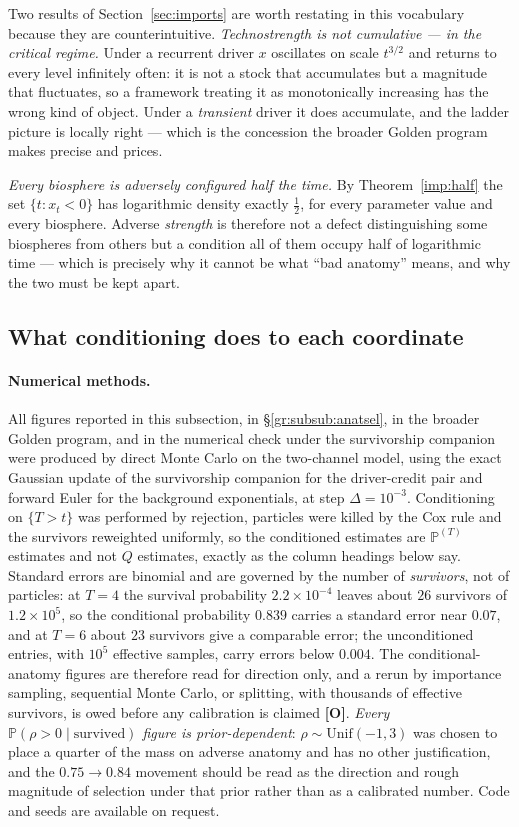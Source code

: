 \documentclass[11pt]{article}
\newcommand{\PP}{\mathbb{P}}
\theoremstyle{plain}
\theoremstyle{definition}
\theoremstyle{remark}
\begin{document}
Two results of Section~\ref{sec:imports} are worth restating in this vocabulary because
they are counterintuitive. \emph{Technostrength is not cumulative --- in the critical regime.}
Under a recurrent driver $x$ oscillates on scale $t^{3/2}$ and returns
to every level infinitely often: it is not a stock that accumulates but
a magnitude that fluctuates, so a framework treating it as monotonically
increasing has the wrong kind of object. Under a \emph{transient} driver
it does accumulate, and the ladder picture is locally right --- which is
the concession the broader Golden program makes precise and prices.

\emph{Every biosphere is adversely configured half the time.} By
Theorem~\ref{imp:half} the set $\{t:x_t<0\}$ has logarithmic density
exactly $\tfrac12$, for every parameter value and every biosphere.
Adverse \emph{strength} is therefore not a defect distinguishing some
biospheres from others but a condition all of them occupy half of
logarithmic time --- which is precisely why it cannot be what
``bad anatomy'' means, and why the two must be kept apart.

\subsection{What conditioning does to each coordinate}
\label{gr:subsub:measured}

\paragraph{Numerical methods.} All figures reported in this subsection,
in \S\ref{gr:subsub:anatsel}, in the broader Golden program, and in
the numerical check under the survivorship companion \cite{SurvA} were
produced by direct Monte Carlo on the two-channel model, using the exact
Gaussian update of the survivorship companion \cite{SurvA} for the driver-credit pair
and forward Euler for the background exponentials, at step
$\Delta=10^{-3}$. Conditioning on $\{T>t\}$ was performed by rejection, particles were killed by the Cox rule and the survivors reweighted
uniformly, so the conditioned estimates are $\PP^{(T)}$ estimates and
not $Q$ estimates, exactly as the column headings below say. Standard errors are binomial and are governed by the number of
\emph{survivors}, not of particles: at $T=4$ the survival probability
$2.2\times10^{-4}$ leaves about $26$ survivors of $1.2\times10^{5}$, so
the conditional probability $0.839$ carries a standard error near
$0.07$, and at $T=6$ about $23$ survivors give a comparable error; the
unconditioned entries, with $10^5$ effective samples, carry errors
below $0.004$. The conditional-anatomy figures are therefore read for
direction only, and a rerun by importance sampling, sequential Monte
Carlo, or splitting, with thousands of effective survivors, is owed
before any calibration is claimed \textbf{[O]}. \emph{Every $\PP(\rho>0\mid\text{survived})$
figure is prior-dependent}: $\rho\sim\mathrm{Unif}(-1,3)$ was chosen to
place a quarter of the mass on adverse anatomy and has no other
justification, and the $0.75\to0.84$ movement should be read as the
direction and rough magnitude of selection under that prior rather than
as a calibrated number. Code and seeds are available on request.
\end{document}
